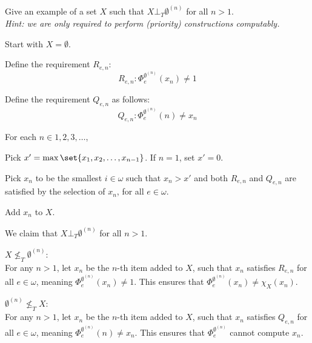 \begin{problem}[3]
  Give an example of a set $X$ such that $X \bot_T \emptyset^{(n)}$
  for all $n > 1$. \\
  \emph{
    Hint: we are only required to perform
    (priority) constructions computably.
  }

  \begin{answer}

    \begin{enumarabic}
      \item Start with $X = \emptyset$.
      \item Define the requirement $R_{e,n}$:
        \[
          R_{e, n} : \Phi_e^{\emptyset^{(n)}}(x_n) \neq 1
        \]
      \item Define the requirement $Q_{e,n}$ as follows:
        \[
          Q_{e,n} : \Phi_e^{\emptyset^{(n)}}(n) \neq x_n
        \]
      \item For each $n \in 1, 2, 3, \ldots$,
        \begin{enumroman}
          \item Pick $x' = \max{ \set{ x_1, x_2, \ldots, x_{n-1}}}$.
            If $n = 1$, set $x' = 0$.
          \item Pick $x_n$ to be the smallest $i \in \omega$ such that
            $x_n > x'$ and both $R_{e,n}$ and $Q_{e,n}$ are satisfied
            by the selection of $x_n$, for all $e \in \omega$.
          \item Add $x_n$ to $X$.
        \end{enumroman}

    \end{enumarabic}

    \step
    We claim that $X \bot_T \emptyset^{(n)}$ for all $n > 1$.
    \begin{enumarabic}
      \item $X \not \leq_T \emptyset^{(n)}$: \\
        For any $n > 1$, let $x_n$ be the $n$-th item added to $X$,
        such that $x_n$ satisfies $R_{e, n}$ for all $e \in \omega$, meaning
        $\Phi_e^{\emptyset^{(n)}}(x_n) \neq 1$.
        This ensures that $\Phi_e^{\emptyset^{(n)}}(x_n) \neq \chi_X(x_n)$.
      \item $\emptyset^{(n)} \not \leq_T X$: \\
        For any $n > 1$, let $x_n$ be the $n$-th item added to $X$,
        such that $x_n$ satisfies $Q_{e, n}$ for all $e \in \omega$, meaning
        $\Phi_e^{\emptyset^{(n)}}(n) \neq x_n$.
        This ensures that $\Phi_e^{\emptyset^{(n)}}$ cannot compute $x_n$.
    \end{enumarabic}
  \end{answer}
\end{problem}
